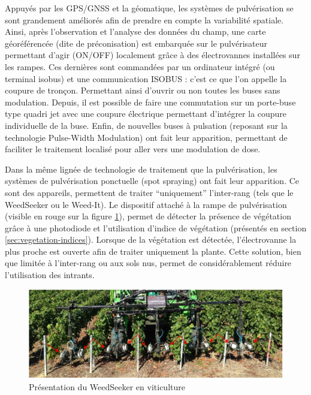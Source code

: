 \documentclass[../thesis.tex]{subfiles}
\begin{document}
    \par Appuyés par les GPS/GNSS et la géomatique, les systèmes de pulvérisation se sont grandement améliorés afin de prendre en compte la variabilité spatiale. Ainsi, après l'observation et l'analyse des données du champ, une carte géoréférencée (dite de préconisation) est embarquée sur le pulvérisateur permettant d'agir (ON/OFF) localement grâce à des électrovannes installées sur les rampes. Ces dernières sont commandées par un ordinateur intégré (ou terminal isobus) et une communication ISOBUS : c'est ce que l'on appelle la coupure de tronçon. Permettant ainsi d'ouvrir ou non toutes les buses sans modulation. Depuis, il est possible de faire une commutation sur un porte-buse type quadri jet avec une coupure électrique permettant d'intégrer la coupure individuelle de la buse. Enfin, de nouvelles buses à pulsation (reposant sur la technologie Pulse-Width Modulation) ont fait leur apparition, permettant de faciliter le traitement localisé pour aller vers une modulation de dose.
    
    \newpage
    
    Dans la même lignée de technologie de traitement que la pulvérisation, les systèmes de pulvérisation ponctuelle (spot spraying) ont fait leur apparition. Ce sont des appareils,  permettent de traiter ``uniquement'' l'inter-rang (tels que le WeedSeeker ou le Weed-It). Le dispositif attaché à la rampe de pulvérisation (visible en rouge sur la figure \ref{fig:02-traitement-weed-seeker}), permet de détecter la présence de végétation grâce à une photodiode et l'utilisation d'indice de végétation (présentés en section \ref{sec:vegetation-indices}). Lorsque de la végétation est détectée, l'électrovanne la plus proche est ouverte afin de traiter uniquement la plante. Cette solution, bien que limitée à l'inter-rang ou aux sols nus, permet de considérablement réduire l'utilisation des intrants.
    
    \begin{figure}[H]
        \centering
        \includegraphics[width=\linewidth]{img/intro/traitement-weed-seeker}
        \caption{Présentation du WeedSeeker en viticulture}
        \label{fig:02-traitement-weed-seeker}
    \end{figure}
    
\end{document}
